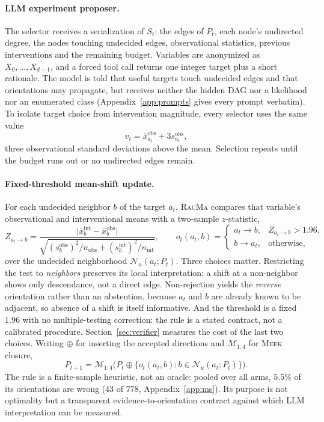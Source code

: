\documentclass{article}
\newcommand{\rauma}{\textsc{RauMa}}
\newcommand{\meek}{\textsc{Meek}}
\begin{document}
\paragraph{LLM experiment proposer.}
The selector receives a serialization of $S_t$: the edges of $P_t$, each node's undirected
degree, the nodes touching undecided edges, observational statistics, previous interventions
and the remaining budget. Variables are anonymized as $X_0,\dots,X_{d-1}$, and a forced tool
call returns one integer target plus a short rationale. The model is told that useful targets
touch undecided edges and that orientations may propagate, but receives neither the hidden DAG
nor a likelihood nor an enumerated class (Appendix~\ref{app:prompts} gives every prompt
verbatim). To isolate target choice from intervention magnitude, every selector uses the same
value
\begin{equation}
v_t = \bar{x}^{\mathrm{obs}}_{a_t} + 3 s^{\mathrm{obs}}_{a_t},
\end{equation}
three observational standard deviations above the mean. Selection repeats until the budget
runs out or no undirected edges remain.

\paragraph{Fixed-threshold mean-shift update.}
For each undecided neighbor $b$ of the target $a_t$, \rauma{} compares that variable's
observational and interventional means with a two-sample $z$-statistic,
\begin{equation}
Z_{a_t \to b} = \frac{\bigl|\bar{x}^{\mathrm{int}}_b - \bar{x}^{\mathrm{obs}}_b\bigr|}
{\sqrt{(s^{\mathrm{obs}}_b)^2/n_{\mathrm{obs}} + (s^{\mathrm{int}}_b)^2/n_{\mathrm{int}}}},
\qquad
o_t(a_t,b) =
\begin{cases}
a_t \to b, & Z_{a_t \to b} > 1.96,\\
b \to a_t, & \text{otherwise,}
\end{cases}
\label{eq:meanshift}
\end{equation}
over the undecided neighborhood $\mathcal{N}_u(a_t; P_t)$. Three choices matter. Restricting
the test to \emph{neighbors} preserves its local interpretation: a shift at a non-neighbor
shows only descendance, not a direct edge. Non-rejection yields the \emph{reverse}
orientation rather than an abstention, because $a_t$ and $b$ are already known to be
adjacent, so absence of a shift is itself informative. And the threshold is a fixed $1.96$
with no multiple-testing correction: the rule is a stated contract, not a calibrated
procedure. Section~\ref{sec:verifier} measures the cost of the last two choices. Writing
$\oplus$ for inserting the accepted directions and $\mathcal{M}_{1:4}$ for \meek{} closure,
\begin{equation}
P_{t+1} = \mathcal{M}_{1:4}\bigl(P_t \oplus \{o_t(a_t,b): b \in \mathcal{N}_u(a_t;P_t)\}\bigr).
\end{equation}
The rule is a finite-sample heuristic, not an oracle: pooled over all arms, $5.5\%$ of its
orientations are wrong (43 of 778, Appendix~\ref{app:ms}). Its purpose is not optimality but
a transparent evidence-to-orientation contract against which LLM interpretation can be
measured.
\end{document}
